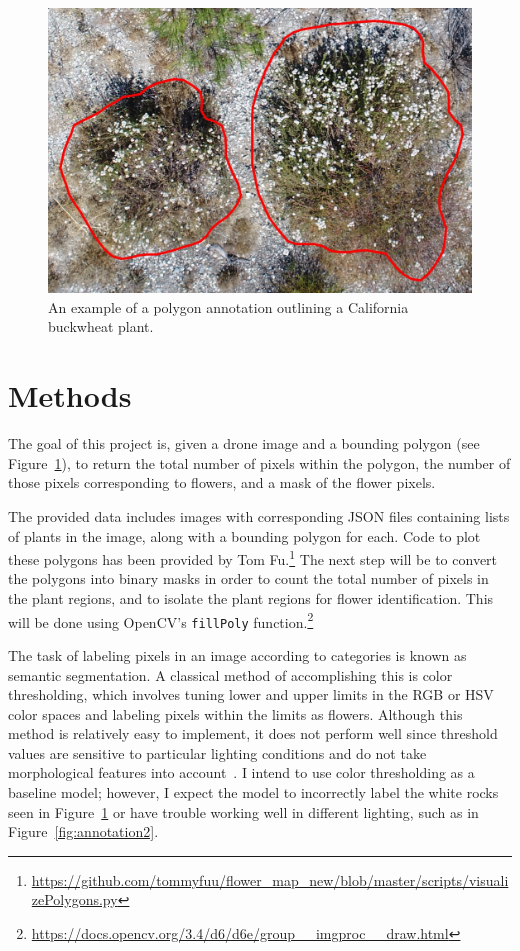 \documentclass[10pt,twocolumn,letterpaper]{article}
\begin{document}
\begin{figure}[t]
  \centering
   \includegraphics[width=0.9\linewidth]{annotation.jpg}
   \caption{An example of a polygon annotation outlining a California buckwheat plant.}
   \label{fig:annotation}
\end{figure}

\section{Methods}

The goal of this project is, given a drone image and a bounding polygon (see Figure~\ref{fig:annotation}), to return the total number of pixels within the polygon, the number of those pixels corresponding to flowers, and a mask of the flower pixels.

The provided data includes images with corresponding JSON files containing lists of plants in the image, along with a bounding polygon for each. Code to plot these polygons has been provided by Tom Fu.\footnote{\url{https://github.com/tommyfuu/flower_map_new/blob/master/scripts/visualizePolygons.py}} The next step will be to convert the polygons into binary masks in order to count the total number of pixels in the plant regions, and to isolate the plant regions for flower identification. This will be done using OpenCV's \texttt{fillPoly} function.\footnote{\url{https://docs.opencv.org/3.4/d6/d6e/group__imgproc__draw.html}}

The task of labeling pixels in an image according to categories is known as semantic segmentation. A classical method of accomplishing this is color thresholding, which involves tuning lower and upper limits in the RGB or HSV color spaces and labeling pixels within the limits as flowers. Although this method is relatively easy to implement, it does not perform well since threshold values are sensitive to particular lighting conditions and do not take morphological features into account~\cite{Dias}. I intend to use color thresholding as a baseline model; however, I expect the model to incorrectly label the white rocks seen in Figure~\ref{fig:annotation} or have trouble working well in different lighting, such as in Figure~\ref{fig:annotation2}.
\end{document}
